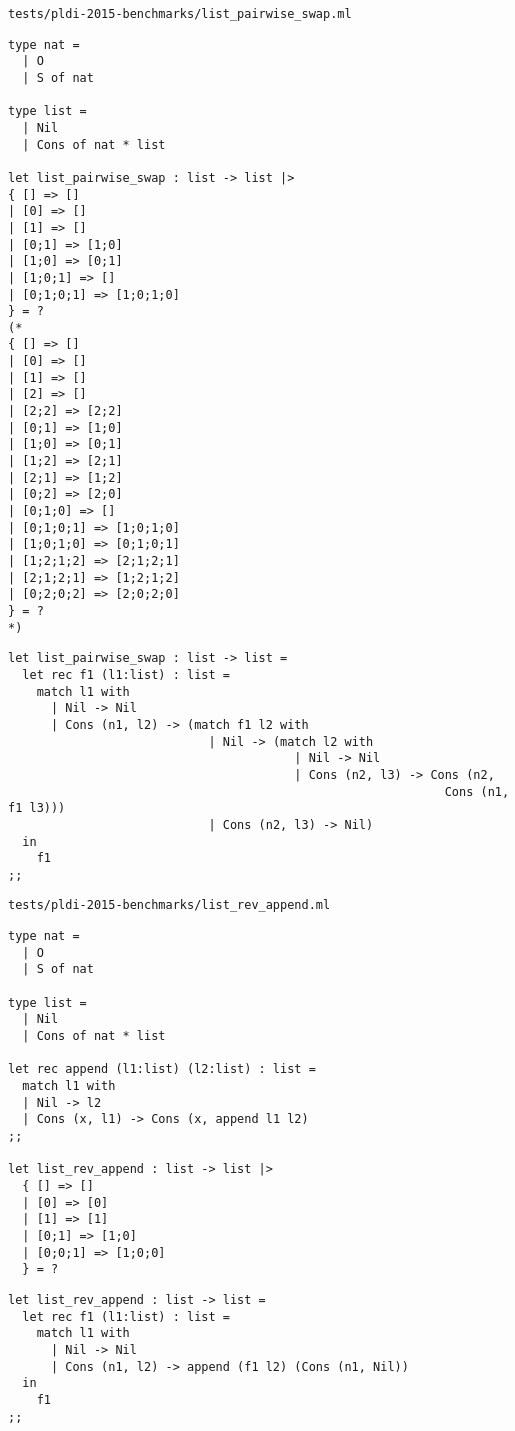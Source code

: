 \noindent\large\texttt{tests/pldi-2015-benchmarks/list\_pairwise\_swap.ml}
\begin{verbatim}
type nat =
  | O
  | S of nat

type list =
  | Nil
  | Cons of nat * list

let list_pairwise_swap : list -> list |>
{ [] => []
| [0] => []
| [1] => []
| [0;1] => [1;0]
| [1;0] => [0;1]
| [1;0;1] => []
| [0;1;0;1] => [1;0;1;0]
} = ?
(*
{ [] => []
| [0] => []
| [1] => []
| [2] => []
| [2;2] => [2;2]
| [0;1] => [1;0]
| [1;0] => [0;1]
| [1;2] => [2;1]
| [2;1] => [1;2]
| [0;2] => [2;0]
| [0;1;0] => []
| [0;1;0;1] => [1;0;1;0]
| [1;0;1;0] => [0;1;0;1]
| [1;2;1;2] => [2;1;2;1]
| [2;1;2;1] => [1;2;1;2]
| [0;2;0;2] => [2;0;2;0]
} = ?
*)
\end{verbatim}

\begin{verbatim}
let list_pairwise_swap : list -> list =
  let rec f1 (l1:list) : list =
    match l1 with
      | Nil -> Nil
      | Cons (n1, l2) -> (match f1 l2 with
                            | Nil -> (match l2 with
                                        | Nil -> Nil
                                        | Cons (n2, l3) -> Cons (n2,
                                                             Cons (n1, f1 l3)))
                            | Cons (n2, l3) -> Nil)
  in
    f1
;;
\end{verbatim}

\noindent\large\texttt{tests/pldi-2015-benchmarks/list\_rev\_append.ml}
\begin{verbatim}
type nat =
  | O
  | S of nat

type list =
  | Nil
  | Cons of nat * list

let rec append (l1:list) (l2:list) : list =
  match l1 with
  | Nil -> l2
  | Cons (x, l1) -> Cons (x, append l1 l2)
;;

let list_rev_append : list -> list |>
  { [] => []
  | [0] => [0]
  | [1] => [1]
  | [0;1] => [1;0]
  | [0;0;1] => [1;0;0]
  } = ?
\end{verbatim}

\begin{verbatim}
let list_rev_append : list -> list =
  let rec f1 (l1:list) : list =
    match l1 with
      | Nil -> Nil
      | Cons (n1, l2) -> append (f1 l2) (Cons (n1, Nil))
  in
    f1
;;
\end{verbatim}

